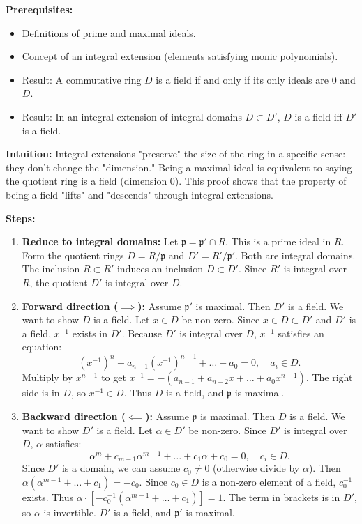 \begin{solution}
\textbf{Prerequisites:}
\begin{itemize}
    \item Definitions of prime and maximal ideals.
    \item Concept of an integral extension (elements satisfying monic polynomials).
    \item Result: A commutative ring $D$ is a field if and only if its only ideals are $0$ and $D$.
    \item Result: In an integral extension of integral domains $D \subset D'$, $D$ is a field iff $D'$ is a field.
\end{itemize}

\textbf{Intuition:}
Integral extensions "preserve" the size of the ring in a specific sense: they don't change the "dimension." Being a maximal ideal is equivalent to saying the quotient ring is a field (dimension 0). This proof shows that the property of being a field "lifts" and "descends" through integral extensions.

\par

\textbf{Steps:}
\begin{enumerate}
    \item \textbf{Reduce to integral domains:} Let $\mathfrak{p} = \mathfrak{p}' \cap R$. This is a prime ideal in $R$. Form the quotient rings $D = R/\mathfrak{p}$ and $D' = R'/\mathfrak{p}'$. Both are integral domains. The inclusion $R \subset R'$ induces an inclusion $D \subset D'$. Since $R'$ is integral over $R$, the quotient $D'$ is integral over $D$.

    \item \textbf{Forward direction ($\implies$):} Assume $\mathfrak{p}'$ is maximal. Then $D'$ is a field. We want to show $D$ is a field. Let $x \in D$ be non-zero. Since $x \in D \subset D'$ and $D'$ is a field, $x^{-1}$ exists in $D'$. Because $D'$ is integral over $D$, $x^{-1}$ satisfies an equation:
    \[ (x^{-1})^n + a_{n-1}(x^{-1})^{n-1} + \dots + a_0 = 0, \quad a_i \in D. \]
    Multiply by $x^{n-1}$ to get $x^{-1} = -(a_{n-1} + a_{n-2}x + \dots + a_0 x^{n-1})$. The right side is in $D$, so $x^{-1} \in D$. Thus $D$ is a field, and $\mathfrak{p}$ is maximal.

    \item \textbf{Backward direction ($\impliedby$):} Assume $\mathfrak{p}$ is maximal. Then $D$ is a field. We want to show $D'$ is a field. Let $\alpha \in D'$ be non-zero. Since $D'$ is integral over $D$, $\alpha$ satisfies:
    \[ \alpha^m + c_{m-1}\alpha^{m-1} + \dots + c_1 \alpha + c_0 = 0, \quad c_i \in D. \]
    Since $D'$ is a domain, we can assume $c_0 \neq 0$ (otherwise divide by $\alpha$). Then $\alpha(\alpha^{m-1} + \dots + c_1) = -c_0$. Since $c_0 \in D$ is a non-zero element of a field, $c_0^{-1}$ exists. Thus $\alpha \cdot [-c_0^{-1}(\alpha^{m-1} + \dots + c_1)] = 1$. The term in brackets is in $D'$, so $\alpha$ is invertible. $D'$ is a field, and $\mathfrak{p}'$ is maximal.
\end{enumerate}
\end{solution}

